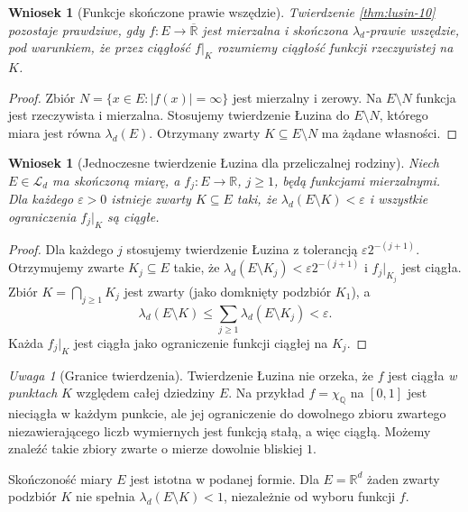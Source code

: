 \documentclass[11pt,a4paper,oneside]{book}
\numberwithin{equation}{chapter}
\theoremstyle{plain}
\newtheorem{wniosek}[twierdzenie]{Wniosek}
\theoremstyle{definition}
\theoremstyle{remark}
\newtheorem{uwaga}[twierdzenie]{Uwaga}
\begin{document}
\begin{wniosek}[Funkcje skończone prawie wszędzie]
\label{cor:lusin-finite-ae-10}
Twierdzenie \ref{thm:lusin-10} pozostaje prawdziwe,
gdy $f:E\to\overline{\mathbb R}$ jest mierzalna i
skończona $\lambda_d$-prawie wszędzie, pod warunkiem,
że przez ciągłość $f|_K$ rozumiemy ciągłość
funkcji \emph{rzeczywistej} na $K$.
\end{wniosek}
\begin{proof}
Zbiór $N=\{x\in E:|f(x)|=\infty\}$ jest
mierzalny i zerowy. Na $E\setminus N$ funkcja
jest rzeczywista i mierzalna. Stosujemy twierdzenie
Łuzina do $E\setminus N$, którego miara jest
równa $\lambda_d(E)$. Otrzymany zwarty
$K\subseteq E\setminus N$ ma żądane własności.
\end{proof}

\begin{wniosek}[Jednoczesne twierdzenie Łuzina dla przeliczalnej rodziny]
\label{cor:countable-lusin-10}
Niech $E\in\mathcal L_d$ ma skończoną miarę,
a $f_j:E\to\mathbb R$, $j\ge1$, będą
funkcjami mierzalnymi. Dla każdego $\varepsilon>0$
istnieje zwarty $K\subseteq E$ taki, że
$\lambda_d(E\setminus K)<\varepsilon$ i
\emph{wszystkie} ograniczenia $f_j|_K$ są ciągłe.
\end{wniosek}
\begin{proof}
Dla każdego $j$ stosujemy twierdzenie Łuzina
z tolerancją $\varepsilon2^{-(j+1)}$.
Otrzymujemy zwarte $K_j\subseteq E$ takie,
że $\lambda_d(E\setminus K_j)<\varepsilon2^{-(j+1)}$
i $f_j|_{K_j}$ jest ciągła.
Zbiór $K=\bigcap_{j\ge1}K_j$ jest zwarty
(jako domknięty podzbiór $K_1$), a
\[
\lambda_d(E\setminus K)
\le\sum_{j\ge1}\lambda_d(E\setminus K_j)
<\varepsilon.
\]
Każda $f_j|_K$ jest ciągła jako ograniczenie
funkcji ciągłej na $K_j$.
\end{proof}

\begin{uwaga}[Granice twierdzenia]
\label{rem:lusin-limitations-10}
Twierdzenie Łuzina nie orzeka, że $f$ jest
ciągła \emph{w punktach} $K$ względem całej
dziedziny $E$. Na przykład $f=\chi_{\mathbb Q}$
na $[0,1]$ jest nieciągła w każdym punkcie, ale
jej ograniczenie do dowolnego zbioru zwartego
niezawierającego liczb wymiernych jest funkcją
stałą, a więc ciągłą. Możemy znaleźć takie
zbiory zwarte o mierze dowolnie bliskiej $1$.

Skończoność miary $E$ jest istotna w podanej formie.
Dla $E=\mathbb R^d$ żaden zwarty podzbiór $K$
nie spełnia $\lambda_d(E\setminus K)<1$,
niezależnie od wyboru funkcji $f$.
\end{uwaga}
\end{document}
